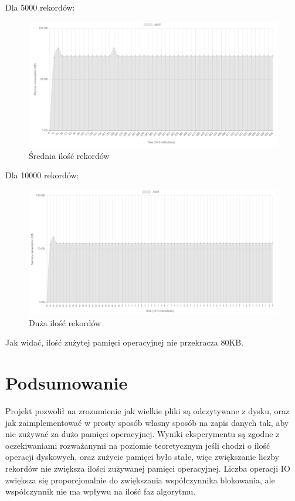 \documentclass[
]{article}
\begin{document}
Dla 5000 rekordów:

\begin{figure}
\centering
\includegraphics{../res/visualizer_medium.png}
\caption{Średnia ilość rekordów}
\end{figure}

Dla 10000 rekordów:

\begin{figure}
\centering
\includegraphics{../res/visualizer_big.png}
\caption{Duża ilość rekordów}
\end{figure}

Jak widać, ilość zużytej pamięci operacyjnej nie przekracza 80KB.

\section{Podsumowanie}\label{podsumowanie}

Projekt pozwolił na zrozumienie jak wielkie pliki są odczytywane z
dysku, oraz jak zaimplementować w prosty sposób własny sposób na zapis
danych tak, aby nie zużywać za dużo pamięci operacyjnej. Wyniki
eksperymentu są zgodne z oczekiwaniami rozważanymi na poziomie
teoretycznym jeśli chodzi o ilość operacji dyskowych, oraz zużycie
pamięci było stałe, więc zwiększanie liczby rekordów nie zwiększa ilości
zużywanej pamięci operacyjnej. Liczba operacji IO zwiększa się
proporcjonalnie do zwiększania współczynnika blokowania, ale
współczynnik nie ma wpływu na ilość faz algorytmu.
\end{document}
